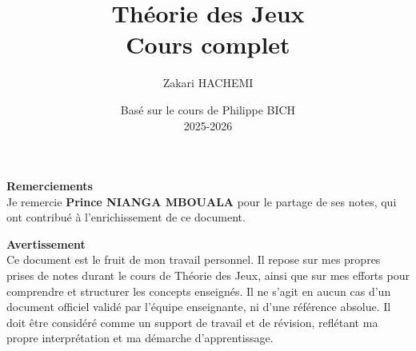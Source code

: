 \documentclass[11pt,a4paper,oneside]{book}
\title{\textbf{Théorie des Jeux}\\[0.5em]
       \large Cours complet}
\author{Zakari HACHEMI}
\date{Basé sur le cours de Philippe BICH \\ 2025-2026}
\numberwithin{equation}{chapter}
\theoremstyle{plain}
\theoremstyle{definition}
\theoremstyle{remark}
\begin{document}

\maketitle

\clearpage
\thispagestyle{empty}
\vspace*{4cm}

\noindent \textbf{Remerciements} \\
Je remercie \textbf{Prince NIANGA MBOUALA} pour le partage de ses notes, qui ont contribué à l'enrichissement de ce document.

\vspace{1.5cm}

\noindent \textbf{Avertissement} \\
Ce document est le fruit de mon travail personnel. Il repose sur mes propres prises de notes durant le cours de Théorie des Jeux, ainsi que sur mes efforts pour comprendre et structurer les concepts enseignés. 
Il ne s'agit en aucun cas d'un document officiel validé par l'équipe enseignante, ni d'une référence absolue. Il doit être considéré comme un support de travail et de révision, reflétant ma propre interprétation et ma démarche d'apprentissage.

\tableofcontents


\mainmatter










\appendix
\end{document}
